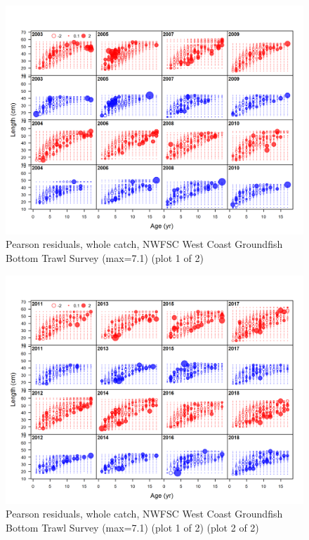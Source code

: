 \documentclass[12pt,]{article}
\begin{document}
\begin{figure}
\centering
\includegraphics{r4ss/plots_mod1/comp_condAALfit_residsflt7mkt0_page1.png}
\caption{Pearson residuals, whole catch, NWFSC West Coast Groundfish
Bottom Trawl Survey (max=7.1) (plot 1 of 2)
\label{fig:nwfsc_combo_pearson_1}}
\end{figure}

\begin{figure}
\centering
\includegraphics{r4ss/plots_mod1/comp_condAALfit_residsflt7mkt0_page2.png}
\caption{Pearson residuals, whole catch, NWFSC West Coast Groundfish
Bottom Trawl Survey (max=7.1) (plot 1 of 2) (plot 2 of 2)
\label{fig:nwfsc_combo_pearson_2}}
\end{figure}
\end{document}
